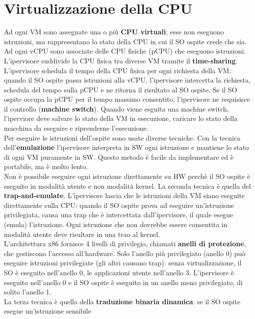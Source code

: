 \documentclass[12pt]{article}
\begin{document}
\section{Virtualizzazione della CPU}
Ad ogni VM sono assegnate una o più \textbf{CPU virtuali}; esse non eseguono istruzioni, ma rappresentano lo stato della 
CPU in cui il SO ospite crede che sia. Ad ogni vCPU sono associate delle CPU fisiche (pCPU) che eseguono istruzioni.
L'ipervisore suddivide la CPU fisica tra diverse VM tramite il \textbf{time-sharing}. L'ipervisore schedula il tempo
della CPU fisica per ogni richiesta della VM: quando il SO ospite passa istruzioni alla vCPU, l'ipervisore intercetta la
richiesta, schedula del tempo sulla pCPU e ne ritorna il risultato al SO ospite. Se il SO ospite occupa la pCPU per il
tempo massimo consentito, l'ipervisore ne requisisce il controllo (\textbf{machine switch}). Quando viene esguita una
machine switch, l'iperviore deve salvare lo stato della VM in esecuzione, caricare lo stato della macchina da eseguire
e riprenderne l'esecuzione.\\
Per eseguire le istruzioni dell'ospite sono usate diverse tecniche. Con la tecnica dell'\textbf{emulazione} l'ipervisore 
interpreta in SW ogni istruzione e mantiene lo stato di ogni VM puramente in SW. Questo metodo è facile da 
implementare ed è portabile, ma è molto lento.\\
Non è possibile eseguire ogni istruzione direttamente su HW perchè il SO ospite è eseguito in modalità utente e non 
modalità kernel. La seconda tecnica è quella del \textbf{trap-and-emulate}. L'ipervisore lascia che le istruzioni della
VM siano eseguite direttamente sulla CPU: quando il SO ospite prova ad eseguire un'istruzione privilegiata, causa una
trap che è intercettata dall'ipervisore, il quale esegue (emula) l'istruzione. Ogni istruzione che non dovrebbe essere
consentita in modalità utente deve risultare in una trao al kernel.\\
L'architettura x86 fornisce 4 livelli di privilegio, chiamati \textbf{anelli di protezione}, che gestiscono l'accesso
all'hardware. Solo l'anello più privilegiato (anello 0) può eseguire istruzioni privilegiate (gli altri causano trap):
senza virtualizzazione, il SO è eseguito nell'anello 0, le applicazioni utente nell'anello 3.
L'ipervisore è eseguito nell'anello 0 e il SO ospite è eseguito in un anello meno privilegiato, di solito l'anello 1.\\
La terza tecnica è quella della \textbf{traduzione binaria dinamica}: se il SO ospite esegue un'istruzione sensibile
\end{document}
